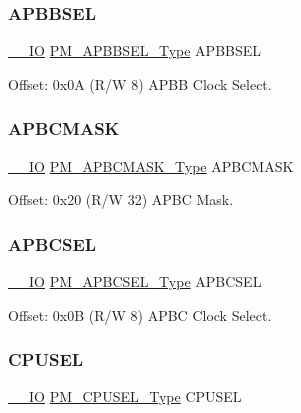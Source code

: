 \subsubsection{\texorpdfstring{APBBSEL}{APBBSEL}}
{\footnotesize\ttfamily \mbox{\hyperlink{core__cm0plus_8h_aec43007d9998a0a0e01faede4133d6be}{\+\_\+\+\_\+\+IO}} \mbox{\hyperlink{union_p_m___a_p_b_b_s_e_l___type}{P\+M\+\_\+\+A\+P\+B\+B\+S\+E\+L\+\_\+\+Type}} A\+P\+B\+B\+S\+EL}



Offset\+: 0x0A (R/W 8) A\+P\+BB Clock Select. 

\mbox{\label{struct_pm_a78c069be496a3aead109a49b29c3d48b}} 
\subsubsection{\texorpdfstring{APBCMASK}{APBCMASK}}
{\footnotesize\ttfamily \mbox{\hyperlink{core__cm0plus_8h_aec43007d9998a0a0e01faede4133d6be}{\+\_\+\+\_\+\+IO}} \mbox{\hyperlink{union_p_m___a_p_b_c_m_a_s_k___type}{P\+M\+\_\+\+A\+P\+B\+C\+M\+A\+S\+K\+\_\+\+Type}} A\+P\+B\+C\+M\+A\+SK}



Offset\+: 0x20 (R/W 32) A\+P\+BC Mask. 

\mbox{\label{struct_pm_a72c4a54c8f24cfd9e31a8493a51a605e}} 
\subsubsection{\texorpdfstring{APBCSEL}{APBCSEL}}
{\footnotesize\ttfamily \mbox{\hyperlink{core__cm0plus_8h_aec43007d9998a0a0e01faede4133d6be}{\+\_\+\+\_\+\+IO}} \mbox{\hyperlink{union_p_m___a_p_b_c_s_e_l___type}{P\+M\+\_\+\+A\+P\+B\+C\+S\+E\+L\+\_\+\+Type}} A\+P\+B\+C\+S\+EL}



Offset\+: 0x0B (R/W 8) A\+P\+BC Clock Select. 

\mbox{\label{struct_pm_a58395c7f1c45e5883c9d67d3a7835907}} 
\subsubsection{\texorpdfstring{CPUSEL}{CPUSEL}}
{\footnotesize\ttfamily \mbox{\hyperlink{core__cm0plus_8h_aec43007d9998a0a0e01faede4133d6be}{\+\_\+\+\_\+\+IO}} \mbox{\hyperlink{union_p_m___c_p_u_s_e_l___type}{P\+M\+\_\+\+C\+P\+U\+S\+E\+L\+\_\+\+Type}} C\+P\+U\+S\+EL}



